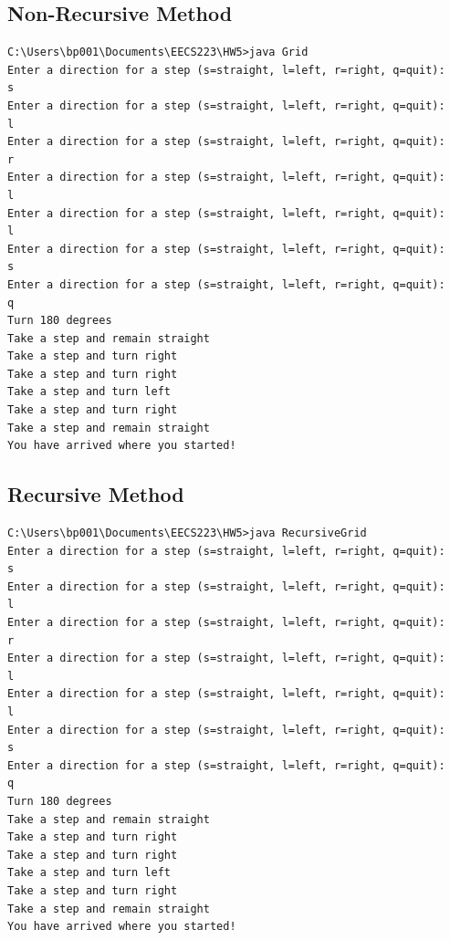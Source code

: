 \documentclass[12pt]{article} %
\begin{document}
\subsection{Non-Recursive Method}
\begin{lstlisting}
C:\Users\bp001\Documents\EECS223\HW5>java Grid
Enter a direction for a step (s=straight, l=left, r=right, q=quit):
s
Enter a direction for a step (s=straight, l=left, r=right, q=quit):
l
Enter a direction for a step (s=straight, l=left, r=right, q=quit):
r
Enter a direction for a step (s=straight, l=left, r=right, q=quit):
l
Enter a direction for a step (s=straight, l=left, r=right, q=quit):
l
Enter a direction for a step (s=straight, l=left, r=right, q=quit):
s
Enter a direction for a step (s=straight, l=left, r=right, q=quit):
q
Turn 180 degrees
Take a step and remain straight
Take a step and turn right
Take a step and turn right
Take a step and turn left
Take a step and turn right
Take a step and remain straight
You have arrived where you started!
\end{lstlisting}
\subsection{Recursive Method}
\begin{lstlisting}
C:\Users\bp001\Documents\EECS223\HW5>java RecursiveGrid
Enter a direction for a step (s=straight, l=left, r=right, q=quit):
s
Enter a direction for a step (s=straight, l=left, r=right, q=quit):
l
Enter a direction for a step (s=straight, l=left, r=right, q=quit):
r
Enter a direction for a step (s=straight, l=left, r=right, q=quit):
l
Enter a direction for a step (s=straight, l=left, r=right, q=quit):
l
Enter a direction for a step (s=straight, l=left, r=right, q=quit):
s
Enter a direction for a step (s=straight, l=left, r=right, q=quit):
q
Turn 180 degrees
Take a step and remain straight
Take a step and turn right
Take a step and turn right
Take a step and turn left
Take a step and turn right
Take a step and remain straight
You have arrived where you started!
\end{lstlisting}
\end{document}
